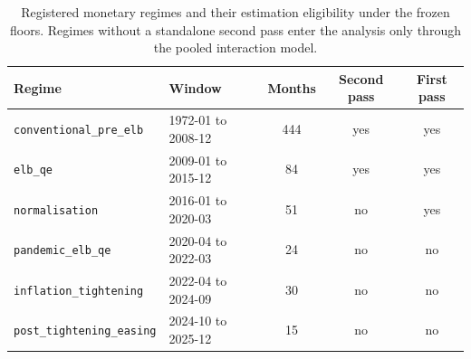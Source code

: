 \begin{table}[htbp]
\centering
\caption{Registered monetary regimes and their estimation eligibility under the
frozen floors. Regimes without a standalone second pass enter the analysis only
through the pooled interaction model.}
\label{tab:eligibility}
\begin{tabular}{llccc}
\toprule
Regime & Window & Months & Second pass & First pass \\
\midrule
\texttt{conventional\_pre\_elb} & 1972-01 to 2008-12 & 444 & yes & yes \\ %
\texttt{elb\_qe} & 2009-01 to 2015-12 & 84 & yes & yes \\ %
\texttt{normalisation} & 2016-01 to 2020-03 & 51 & no & yes \\ %
\texttt{pandemic\_elb\_qe} & 2020-04 to 2022-03 & 24 & no & no \\ %
\texttt{inflation\_tightening} & 2022-04 to 2024-09 & 30 & no & no \\ %
\texttt{post\_tightening\_easing} & 2024-10 to 2025-12 & 15 & no & no \\ %
\bottomrule
\end{tabular}
\end{table}
